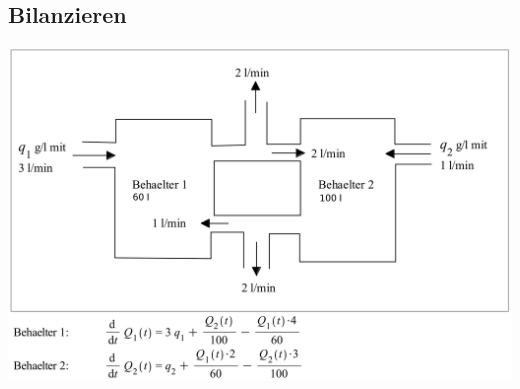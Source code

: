 \subsection{Bilanzieren}
\begin{minipage}[h]{0.7\textwidth}
	\includegraphics[width=1.0\textwidth]{images/Bilanzieren.png}
\end{minipage}

